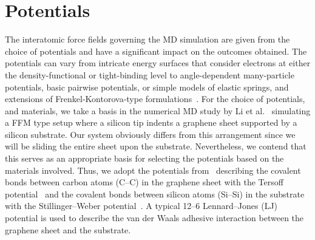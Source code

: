 \section{Potentials}\label{sec:potentials}
The interatomic force fields governing the \acrshort{MD} simulation are given from the choice of potentials and have a significant impact on the outcomes obtained. The potentials can vary from intricate energy surfaces that consider electrons at either the density-functional or tight-binding level to angle-dependent many-particle potentials, basic pairwise potentials, or simple models of elastic springs, and extensions of Frenkel-Kontorova-type formulations~\cite{Vanossi_2013}. For the choice of
potentials, and materials, we take a basis in the numerical \acrshort{MD} study
by Li et al.~\cite{li_evolving_2016} simulating a \acrshort{FFM} type setup
where a silicon tip indents a graphene sheet supported by a silicon substrate. Our system obviously differs from this arrangement since we will be sliding the entire sheet upon the substrate. Nevertheless, we contend that this serves as an appropriate basis for selecting the potentials based on the materials involved. Thus, we adopt the potentials from~\cite{li_evolving_2016} describing the covalent bonds between carbon atoms (C--C) in the graphene sheet with the Tersoff potential~\cite{PhysRevB.37.6991} and the covalent bonds between silicon atoms (Si--Si) in the substrate with the Stillinger–Weber potential~\cite{PhysRevB.31.5262}. A typical 12--6 Lennard–Jones (\acrshort{LJ}) potential is used to describe the van der Waals adhesive interaction between the graphene sheet and the substrate. 

